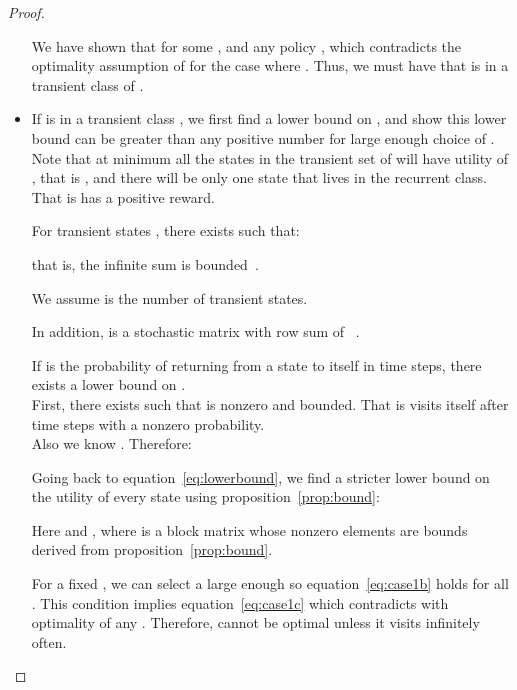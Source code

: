 \begin{proof}
\begin{itemize}
We have shown that for some , and any policy ,  which contradicts the optimality assumption of  for the case where . Thus, we must have that  is in a transient class of . 


\item If  is in a transient class , we first find a lower bound on , and show this lower bound can be greater than any positive number for large enough choice of . 
Note that at minimum all the states in the transient set of  will have utility of , that is , and there will be only one state  that lives in the recurrent class. That is  has a positive reward. 

\begin{prop}
\label{prop:N}
For transient states ,  there exists  such that:

that is, the infinite sum is bounded~\cite{Durrett2012}. 
\end{prop}



We assume  is the number of transient states.

In addition,  is a stochastic matrix with row sum of ~\cite{Durrett2012}.










\begin{prop}
\label{prop:bound}
If  is the probability of returning from a state  to itself in  time steps, there exists a lower bound on .\\ 
First, there exists  such that  is nonzero and bounded. That is  visits itself after  time steps with a nonzero probability. \\
Also we know
. Therefore:

\end{prop}







 Going back to equation~\eqref{eq:lowerbound}, we find a stricter lower bound on the utility of every state  using proposition~\ref{prop:bound}:



 
 Here  and , where  is a block matrix whose nonzero elements are  bounds derived from proposition~\ref{prop:bound}.
 
 



For a fixed , we can select a large enough  so equation~\eqref{eq:case1b} holds for all .
This condition implies equation~\eqref{eq:case1c} which contradicts with optimality of any . Therefore,  cannot be optimal unless it visits  infinitely often.
\end{itemize}


\end{proof}
